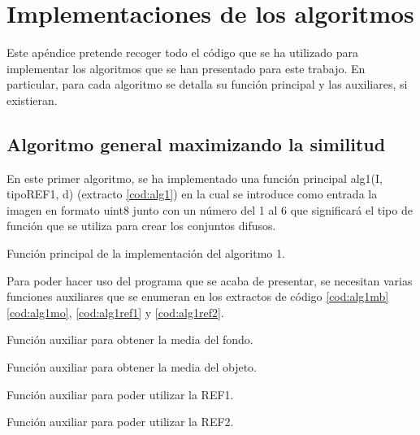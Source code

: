 \chapter{Implementaciones de los algoritmos}

Este apéndice pretende recoger todo el código que se ha utilizado para implementar los algoritmos que se han presentado para este trabajo. En particular, para cada algoritmo se detalla su función principal y las auxiliares, si existieran.


\section{Algoritmo general maximizando la similitud}
En este primer algoritmo, se ha implementado una función principal {\ttfamily alg1(I, tipoREF1, d)} (extracto \ref{cod:alg1}) en la cual se introduce como entrada la imagen en formato {\ttfamily uint8} junto con un número del 1 al 6 que significará el tipo de función que se utiliza para crear los conjuntos difusos.
\begin{listing}
    \caption{Función principal de la implementación del algoritmo 1.\label{cod:alg1}}
\end{listing}

Para poder hacer uso del programa que se acaba de presentar, se necesitan varias funciones auxiliares que se enumeran en los extractos de código \ref{cod:alg1mb} \ref{cod:alg1mo}, \ref{cod:alg1ref1} y \ref{cod:alg1ref2}.
\newpage
\begin{listing}
    \caption{Función auxiliar para obtener la media del fondo.\label{cod:alg1mb}}
\end{listing}
\begin{listing}
    \caption{Función auxiliar para obtener la media del objeto.\label{cod:alg1mo}}
\end{listing}
\begin{listing}
    \caption{Función auxiliar para poder utilizar la REF1.\label{cod:alg1ref1}}
\end{listing}
\newpage
\begin{listing}
    \caption{Función auxiliar para poder utilizar la REF2.\label{cod:alg1ref2}}
\end{listing}

